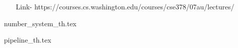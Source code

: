 
\begin{enumerate}
    \item[Link-] https://courses.cs.washington.edu/courses/cse378/07au/lectures/
\end{enumerate}

{number_system_th.tex}      \newpage

{pipeline_th.tex}            \newpage
